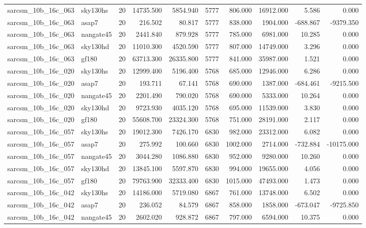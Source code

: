 \begin{tabular}{llrrrrrrrr}
sarcsm\_10b\_16c\_063 & sky130hs & 20 & 14735.500 & 5854.940 & 5777 & 806.000 & 16912.000 & 5.586 & 0.000 \\
sarcsm\_10b\_16c\_063 & asap7 & 20 & 216.502 & 80.817 & 5777 & 838.000 & 1904.000 & -688.867 & -9379.350 \\
sarcsm\_10b\_16c\_063 & nangate45 & 20 & 2441.840 & 879.928 & 5777 & 785.000 & 6981.000 & 10.285 & 0.000 \\
sarcsm\_10b\_16c\_063 & sky130hd & 20 & 11010.300 & 4520.590 & 5777 & 807.000 & 14749.000 & 3.296 & 0.000 \\
sarcsm\_10b\_16c\_063 & gf180 & 20 & 63713.300 & 26335.800 & 5777 & 841.000 & 35987.000 & 1.521 & 0.000 \\
sarcsm\_10b\_16c\_020 & sky130hs & 20 & 12999.400 & 5196.400 & 5768 & 685.000 & 12946.000 & 6.286 & 0.000 \\
sarcsm\_10b\_16c\_020 & asap7 & 20 & 193.711 & 67.141 & 5768 & 690.000 & 1387.000 & -684.461 & -9215.500 \\
sarcsm\_10b\_16c\_020 & nangate45 & 20 & 2201.490 & 790.020 & 5768 & 690.000 & 5333.000 & 10.264 & 0.000 \\
sarcsm\_10b\_16c\_020 & sky130hd & 20 & 9723.930 & 4035.120 & 5768 & 695.000 & 11539.000 & 3.830 & 0.000 \\
sarcsm\_10b\_16c\_020 & gf180 & 20 & 55608.700 & 23324.300 & 5768 & 751.000 & 28191.000 & 2.117 & 0.000 \\
sarcsm\_10b\_16c\_057 & sky130hs & 20 & 19012.300 & 7426.170 & 6830 & 982.000 & 23312.000 & 6.082 & 0.000 \\
sarcsm\_10b\_16c\_057 & asap7 & 20 & 275.992 & 100.660 & 6830 & 1002.000 & 2714.000 & -732.884 & -10175.000 \\
sarcsm\_10b\_16c\_057 & nangate45 & 20 & 3044.280 & 1086.880 & 6830 & 952.000 & 9280.000 & 10.260 & 0.000 \\
sarcsm\_10b\_16c\_057 & sky130hd & 20 & 13845.100 & 5597.870 & 6830 & 994.000 & 19655.000 & 4.056 & 0.000 \\
sarcsm\_10b\_16c\_057 & gf180 & 20 & 79763.900 & 32333.400 & 6830 & 1015.000 & 47493.000 & 1.473 & 0.000 \\
sarcsm\_10b\_16c\_042 & sky130hs & 20 & 14186.000 & 5719.080 & 6867 & 761.000 & 13748.000 & 6.502 & 0.000 \\
sarcsm\_10b\_16c\_042 & asap7 & 20 & 236.052 & 84.579 & 6867 & 858.000 & 1858.000 & -673.047 & -9725.850 \\
sarcsm\_10b\_16c\_042 & nangate45 & 20 & 2602.020 & 928.872 & 6867 & 797.000 & 6594.000 & 10.375 & 0.000 \\

\end{tabular}
